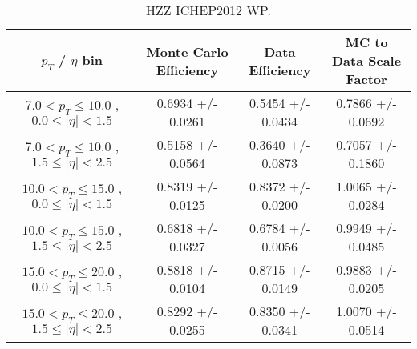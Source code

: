 
 \begin{table}[!ht]
 \begin{center} 
 \begin{tabular}{|c|c|c|c|}
 \hline
 $p_{T}$ / $\eta$ bin    &  Monte Carlo Efficiency    &  Data Efficiency   &  MC to Data Scale Factor \\   \hline           
$  7.0 < p_{T} \le  10.0$ , $  0.0  \le |\eta| <   1.5$   &       0.6934 +/- 0.0261   &       0.5454 +/- 0.0434   &       0.7866 +/- 0.0692   \\   
\hline
$  7.0 < p_{T} \le  10.0$ , $  1.5  \le |\eta| <   2.5$   &       0.5158 +/- 0.0564   &       0.3640 +/- 0.0873   &       0.7057 +/- 0.1860   \\   
\hline
$ 10.0 < p_{T} \le  15.0$ , $  0.0  \le |\eta| <   1.5$   &       0.8319 +/- 0.0125   &       0.8372 +/- 0.0200   &       1.0065 +/- 0.0284   \\   
\hline
$ 10.0 < p_{T} \le  15.0$ , $  1.5  \le |\eta| <   2.5$   &       0.6818 +/- 0.0327   &       0.6784 +/- 0.0056   &       0.9949 +/- 0.0485   \\   
\hline
$ 15.0 < p_{T} \le  20.0$ , $  0.0  \le |\eta| <   1.5$   &       0.8818 +/- 0.0104   &       0.8715 +/- 0.0149   &       0.9883 +/- 0.0205   \\   
\hline
$ 15.0 < p_{T} \le  20.0$ , $  1.5  \le |\eta| <   2.5$   &       0.8292 +/- 0.0255   &       0.8350 +/- 0.0341   &       1.0070 +/- 0.0514   \\   
\hline
\end{tabular}
\caption{HZZ ICHEP2012 WP.}
\label{tab:eff_ele_offline}
\end{center}
\end{table}





